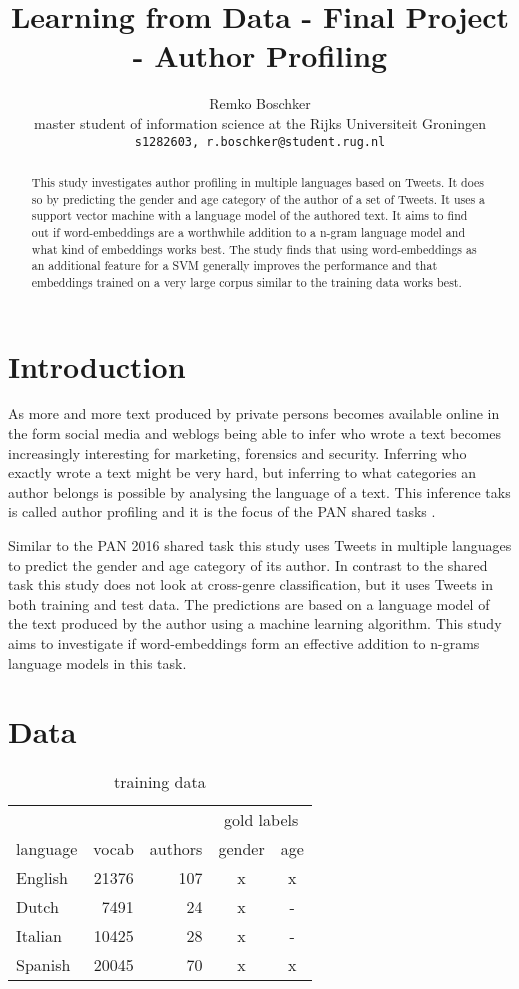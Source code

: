\documentclass[11pt]{article}
\title{Learning from Data - Final Project - Author Profiling}
\author{Remko Boschker \\
  master student of information science at the Rijks Universiteit Groningen \\
  {\tt s1282603, r.boschker@student.rug.nl} }
\date{}
\begin{document}
\maketitle
\begin{abstract}

  This study investigates author profiling in multiple languages based on Tweets. It does so by predicting the gender and age category of the author of a set of Tweets. It uses a support vector machine with a language model of the authored text. It aims to find out if word-embeddings are a worthwhile addition to a n-gram language model and what kind of embeddings works best. The study finds that using word-embeddings as an additional feature for a SVM generally improves the performance and that embeddings trained on a very large corpus similar to the training data works best.

\end{abstract}

\section{Introduction}

As more and more text produced by private persons becomes available online in the form social media and weblogs being able to infer who wrote a text becomes increasingly interesting for marketing, forensics and security. Inferring who exactly wrote a text might be very hard, but inferring to what categories an author belongs is possible by analysing the language of a text. This inference taks is called author profiling and it is the focus of the PAN shared tasks \cite{rangel2016overview}.

Similar to the PAN 2016 shared task this study uses Tweets in multiple languages to predict the gender and age category of its author. In contrast to the shared task this study does not look at cross-genre classification, but it uses Tweets in both training and test data. The predictions are based on a language model of the text produced by the author using a machine learning algorithm. This study aims to investigate if word-embeddings form an effective addition to n-grams language models in this task.

\section{Data}

\begin{table}[ht]
  \caption{training data}
  \label{tab:vocab-size}
  \begin{tabular}{ l r r c c }
    & & & \multicolumn{2}{c}{gold labels} \\
    \cline{4-5}
    language & vocab & authors & gender & age \\
    \hline
    English & 21376 & 107 & x & x \\
    Dutch   &  7491 &  24 & x & - \\
    Italian & 10425 &  28 & x & - \\
    Spanish & 20045 &  70 & x & x \\
  \end{tabular}
\end{table}
\end{document}
